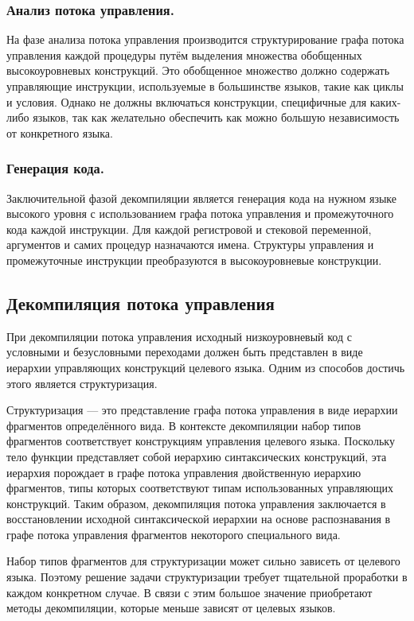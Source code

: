 \subsubsection*{Анализ потока управления.} 
На фазе анализа потока управления производится структурирование графа потока управления каждой процедуры путём выделения множества обобщенных высокоуровневых конструкций. Это обобщенное множество должно содержать управляющие инструкции, используемые в большинстве языков, такие как циклы и условия. Однако не должны включаться конструкции, специфичные для каких-либо языков, так как желательно обеспечить как можно большую независимость от конкретного языка.
\subsubsection*{Генерация кода.} 
Заключительной фазой декомпиляции является генерация кода на нужном языке высокого уровня с использованием графа потока управления и промежуточного кода каждой инструкции. Для каждой регистровой и стековой переменной, аргументов и самих процедур назначаются имена. Структуры управления и промежуточные инструкции преобразуются в высокоуровневые конструкции.


\subsection{Декомпиляция потока управления}

При декомпиляции потока управления исходный низкоуровневый код с условными и безусловными переходами должен быть представлен в виде иерархии управляющих конструкций целевого языка. Одним из способов достичь этого является структуризация.

Структуризация --- это представление графа потока управления в виде иерархии фрагментов определённого вида. В контексте декомпиляции набор типов фрагментов соответствует конструкциям управления целевого языка. Поскольку тело функции представляет собой иерархию синтаксических конструкций, эта иерархия порождает в графе потока управления двойственную иерархию фрагментов, типы которых соответствуют типам использованных управляющих конструкций. Таким образом, декомпиляция потока управления заключается в восстановлении исходной синтаксической иерархии на основе распознавания в графе потока управления фрагментов некоторого специального вида.

Набор типов фрагментов для структуризации может сильно зависеть от целевого языка. Поэтому решение задачи структуризации требует тщательной проработки в каждом конкретном случае. В связи с этим большое значение приобретают методы декомпиляции, которые меньше зависят от целевых языков. 

